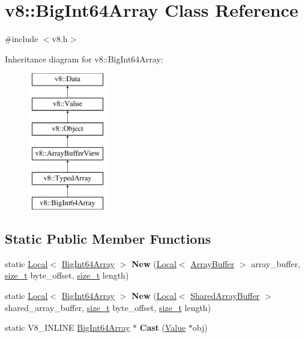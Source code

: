 \hypertarget{classv8_1_1BigInt64Array}{}\section{v8\+:\+:Big\+Int64\+Array Class Reference}
\label{classv8_1_1BigInt64Array}


{\ttfamily \#include $<$v8.\+h$>$}

Inheritance diagram for v8\+:\+:Big\+Int64\+Array\+:\begin{figure}[H]
\begin{center}
\leavevmode
\includegraphics[height=6.000000cm]{classv8_1_1BigInt64Array}
\end{center}
\end{figure}
\subsection*{Static Public Member Functions}
\begin{DoxyCompactItemize}
\item 
\mbox{\label{classv8_1_1BigInt64Array_a6f8331c7a7e8f3e76efa64016941d789}} 
static \mbox{\hyperlink{classv8_1_1Local}{Local}}$<$ \mbox{\hyperlink{classv8_1_1BigInt64Array}{Big\+Int64\+Array}} $>$ {\bfseries New} (\mbox{\hyperlink{classv8_1_1Local}{Local}}$<$ \mbox{\hyperlink{classv8_1_1ArrayBuffer}{Array\+Buffer}} $>$ array\+\_\+buffer, \mbox{\hyperlink{classsize__t}{size\+\_\+t}} byte\+\_\+offset, \mbox{\hyperlink{classsize__t}{size\+\_\+t}} length)
\item 
\mbox{\label{classv8_1_1BigInt64Array_ac25328514d8f163e92360b3b921e95f5}} 
static \mbox{\hyperlink{classv8_1_1Local}{Local}}$<$ \mbox{\hyperlink{classv8_1_1BigInt64Array}{Big\+Int64\+Array}} $>$ {\bfseries New} (\mbox{\hyperlink{classv8_1_1Local}{Local}}$<$ \mbox{\hyperlink{classv8_1_1SharedArrayBuffer}{Shared\+Array\+Buffer}} $>$ shared\+\_\+array\+\_\+buffer, \mbox{\hyperlink{classsize__t}{size\+\_\+t}} byte\+\_\+offset, \mbox{\hyperlink{classsize__t}{size\+\_\+t}} length)
\item 
\mbox{\label{classv8_1_1BigInt64Array_a7530edf62ef0b242da378e886256f8da}} 
static V8\+\_\+\+I\+N\+L\+I\+NE \mbox{\hyperlink{classv8_1_1BigInt64Array}{Big\+Int64\+Array}} $\ast$ {\bfseries Cast} (\mbox{\hyperlink{classv8_1_1Value}{Value}} $\ast$obj)
\end{DoxyCompactItemize}
